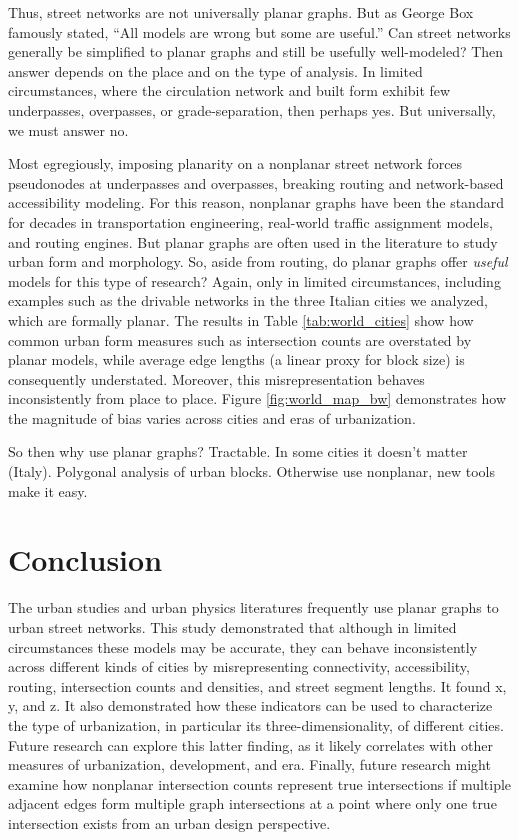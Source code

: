 \documentclass[Afour,sageh,times]{sagej}
\begin{document}
Thus, street networks are not universally planar graphs. But as George Box famously stated, \enquote{All models are wrong but some are useful.} Can street networks generally be simplified to planar graphs and still be usefully well-modeled? Then answer depends on the place and on the type of analysis. In limited circumstances, where the circulation network and built form exhibit few underpasses, overpasses, or grade-separation, then perhaps yes. But universally, we must answer no.

Most egregiously, imposing planarity on a nonplanar street network forces pseudonodes at underpasses and overpasses, breaking routing and network-based accessibility modeling. For this reason, nonplanar graphs have been the standard for decades in transportation engineering, real-world traffic assignment models, and routing engines. But planar graphs are often used in the literature to study urban form and morphology. So, aside from routing, do planar graphs offer \emph{useful} models for this type of research? Again, only in limited circumstances, including examples such as the drivable networks in the three Italian cities we analyzed, which are formally planar. The results in Table \ref{tab:world_cities} show how common urban form measures such as intersection counts are overstated by planar models, while average edge lengths (a linear proxy for block size) is consequently understated. Moreover, this misrepresentation behaves inconsistently from place to place. Figure \ref{fig:world_map_bw} demonstrates how the magnitude of bias varies across cities and eras of urbanization.

So then why use planar graphs? Tractable. In some cities it doesn't matter (Italy). Polygonal analysis of urban blocks. Otherwise use nonplanar, new tools make it easy.


\section{Conclusion}

The urban studies and urban physics literatures frequently use planar graphs to urban street networks. This study demonstrated that although in limited circumstances these models may be accurate, they can behave inconsistently across different kinds of cities by misrepresenting connectivity, accessibility, routing, intersection counts and densities, and street segment lengths. It found x, y, and z. It also demonstrated how these indicators can be used to characterize the type of urbanization, in particular its three-dimensionality, of different cities. Future research can explore this latter finding, as it likely correlates with other measures of urbanization, development, and era. Finally, future research might examine how nonplanar intersection counts represent true intersections if multiple adjacent edges form multiple graph intersections at a point where only one true intersection exists from an urban design perspective.


\clearpage


\end{document}
